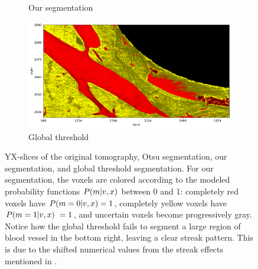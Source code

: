 \begin{figure}
\begin{subfigure}{0.5\textwidth}
      \caption{Our segmentation}
    \end{subfigure}%
    \begin{subfigure}{0.5\textwidth}
      \centering
      \includegraphics[width=\linewidth]{generated/770c_pag_global_yx.pdf}
      \caption{Global threshold}
    \end{subfigure}
  \caption{YX-slices of the original tomography, Otsu segmentation, our
	segmentation, and global threshold segmentation.  For our segmentation,
	the voxels are colored according to the modeled probability functions
	$P(m\vert v,x)$ between 0 and 1: completely red voxels have
	$P(m=0\vert v,x) = 1$, completely yellow voxels have $P(m=1\vert
	v,x)\ = 1$, and uncertain voxels become progressively gray. Notice
	how the global threshold fails to segment a large region of blood
	vessel in the bottom right, leaving a clear streak pattern. This is due
	to the shifted numerical values from the streak effects mentioned in
	.}
    \label{fig:histology-comparison1}
\end{figure}

